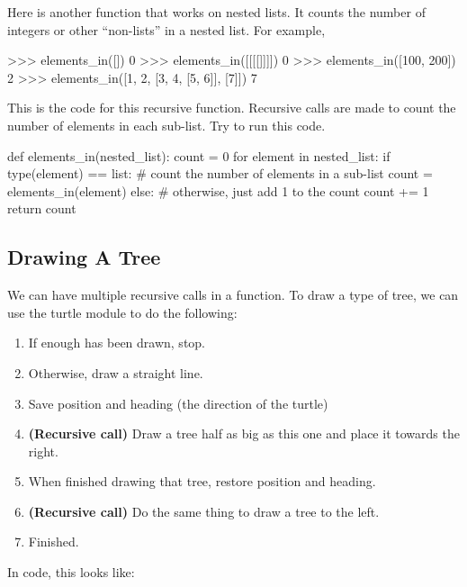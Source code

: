 \documentclass[11pt]{cselabheader}
\begin{document}
Here is another function that works on nested lists.
It counts the number of integers or other ``non-lists'' in a nested list.
For example,

\begin{pyconcode}
>>> elements_in([])
0
>>> elements_in([[[[]]]])
0
>>> elements_in([100, 200])
2
>>> elements_in([1, 2, [3, 4, [5, 6]], [7]])
7
\end{pyconcode}

This is the code for this recursive function. Recursive calls are made to count
the number of elements in each sub-list. Try to run this code.

\begin{python3code}
def elements_in(nested_list):
    count = 0
    for element in nested_list:
        if type(element) == list:
            # count the number of elements in a sub-list
            count = elements_in(element)
        else:
            # otherwise, just add 1 to the count
            count += 1
    return count
\end{python3code}

\subsection{Drawing A Tree}

We can have multiple recursive calls in a function. To draw a type of tree,
we can use the turtle module to do the following:

\begin{enumerate}
\item If enough has been drawn, stop.
\item Otherwise, draw a straight line.
\item Save position and heading (the direction of the turtle)
\item \textbf{(Recursive call)} Draw a tree half as big as this one
and place it towards the right.
\item When finished drawing that tree, restore position and heading.
\item \textbf{(Recursive call)} Do the same thing to draw a tree to
the left.
\item Finished.
\end{enumerate}

In code, this looks like:
\end{document}
